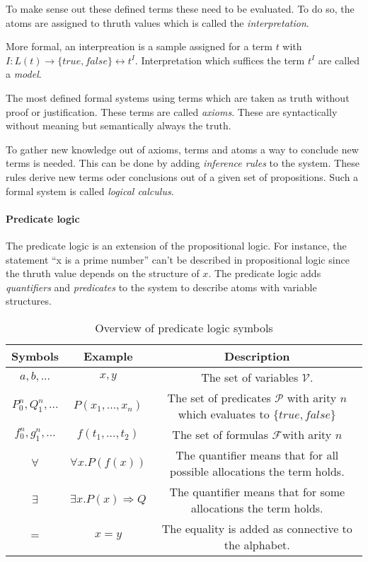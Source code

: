 To make sense out these defined terms these need to be evaluated. To do so,
the atoms are assigned to thruth values which is called the \textit{interpretation}.~\cite{tuschik1994mathematische}

\begin{defi}
  More formal, an interpreation is a sample assigned for a term $t$ with
  $I:L(t)\rightarrow \{true,false\} \leftrightarrow t^I$. Interpretation which suffices the term
  $t^I$ are called a \textit{model}.
\end{defi}

The most defined formal systems using terms which are taken as truth without
proof or justification. These terms are called \textit{axioms}. These are syntactically
without meaning but semantically always the truth.~\cite{tuschik1994mathematische}

To gather new knowledge out of axioms, terms and atoms a way to conclude
new terms is needed. This can be done by adding \textit{inference rules} to
the system. These rules derive new terms oder conclusions out of a given
set of propositions. Such a formal system is called \textit{logical calculus}.

\paragraph{Predicate logic}
The predicate logic is an extension of the propositional logic.
For instance, the statement ``x is a prime number'' can't be described
in propositional logic since the thruth value depends on the structure of $x$.
The predicate logic adds \textit{quantifiers} and \textit{predicates} to the
system to describe atoms with variable structures.~\cite{heinemann2013logik}

\begin{table}[h]
  \centering
  \begin{tabular}{c|c|c}
    Symbols & Example & Description\\\hline
    $a,b,...$ & $x,y$ & The set of variables $\mathcal{V}$.\\
    $P_0^n,Q_1^n,...$ & $P(x_1,...,x_n)$ & The set of predicates $\mathcal{P}$ with arity $n$
                                          which evaluates to $\{true,false\}$\\
    $f_0^n,g_1^n,...$ & $f(t_1,...,t_2)$ & The set of formulas $\mathcal{F}$with arity $n$\\
    $\forall$ & $\forall x.P(f(x))$ & The quantifier means that for all possible allocations the term holds.\\
    $\exists$ & $\exists x.P(x)\Rightarrow Q$ & The quantifier means that for some allocations the term holds.\\
    $=$ & $x = y$ & The equality is added as connective to the alphabet.\\
  \end{tabular}
  \caption{Overview of predicate logic symbols}
  \label{tab:predlogic}
\end{table}

